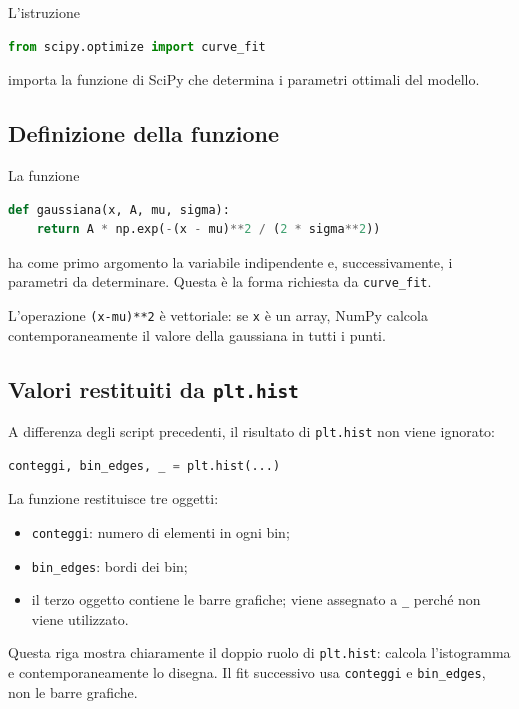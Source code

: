 \documentclass[11pt,a4paper]{book}
\begin{document}
L'istruzione

\begin{lstlisting}[language=Python]
from scipy.optimize import curve_fit
\end{lstlisting}

importa la funzione di SciPy che determina i parametri ottimali del
modello.

\subsection{Definizione della funzione}

La funzione

\begin{lstlisting}[language=Python]
def gaussiana(x, A, mu, sigma):
    return A * np.exp(-(x - mu)**2 / (2 * sigma**2))
\end{lstlisting}

ha come primo argomento la variabile indipendente e, successivamente, i
parametri da determinare. Questa è la forma richiesta da
\texttt{curve\_fit}.

L'operazione \texttt{(x-mu)**2} è vettoriale: se \texttt{x} è un array,
NumPy calcola contemporaneamente il valore della gaussiana in tutti i
punti.

\subsection{Valori restituiti da \texttt{plt.hist}}

A differenza degli script precedenti, il risultato di \texttt{plt.hist}
non viene ignorato:

\begin{lstlisting}[language=Python]
conteggi, bin_edges, _ = plt.hist(...)
\end{lstlisting}

La funzione restituisce tre oggetti:

\begin{itemize}
    \item \texttt{conteggi}: numero di elementi in ogni bin;
    \item \texttt{bin\_edges}: bordi dei bin;
    \item il terzo oggetto contiene le barre grafiche; viene assegnato a
          \texttt{\_} perché non viene utilizzato.
\end{itemize}

Questa riga mostra chiaramente il doppio ruolo di \texttt{plt.hist}:
calcola l'istogramma e contemporaneamente lo disegna. Il fit successivo
usa \texttt{conteggi} e \texttt{bin\_edges}, non le barre grafiche.
\end{document}
